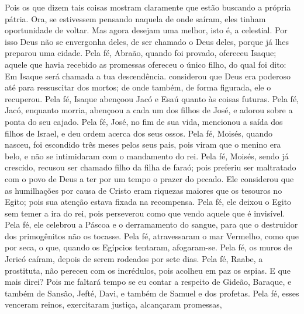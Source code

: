 {  Pois os que dizem tais coisas mostram claramente que estão buscando a
{} própria pátria.
  Ora, se estivessem pensando naquela de onde saíram, eles tinham oportunidade de voltar.
  Mas agora desejam uma melhor, isto é, a celestial. Por isso Deus não se envergonha deles, de ser chamado o Deus deles, porque já lhes preparou uma cidade.
  Pela fé, Abraão, quando foi provado, ofereceu Isaque; aquele que havia recebido as promessas ofereceu o
{} único filho,
  do qual foi dito: Em Isaque será chamada a tua descendência.
{}
   considerou que Deus era poderoso até para ressuscitar
{} dos mortos; de onde também, de forma figurada, ele o recuperou.
  Pela fé, Isaque abençoou Jacó e Esaú quanto às coisas futuras.
  Pela fé, Jacó, enquanto morria, abençoou a cada um dos filhos de José, e adorou
{} sobre a ponta do seu cajado.
  Pela fé, José, no fim de sua vida,
 mencionou a saída dos filhos de Israel, e deu ordem acerca dos seus ossos.
  Pela fé, Moisés, quando nasceu, foi escondido três meses pelos seus pais, pois viram que o menino era belo, e não se intimidaram com o mandamento do rei.
  Pela fé, Moisés, sendo já crescido, recusou ser chamado filho da filha de faraó;
  pois preferiu ser maltratado com o povo de Deus a ter por um tempo o prazer do pecado.
  Ele considerou que as humilhações por causa de Cristo eram riquezas maiores que os tesouros no Egito; pois sua atenção estava fixada na recompensa.
  Pela fé, ele deixou o Egito sem temer a ira do rei, pois perseverou como que vendo aquele que é invisível.
  Pela fé, ele celebrou a Páscoa e o derramamento do sangue, para que o destruidor dos primogênitos não os tocasse.
  Pela fé, atravessaram o mar Vermelho, como que por
{} seca, o que, quando os Egípcios tentaram, afogaram-se.
  Pela fé, os muros de Jericó caíram, depois de serem rodeados por sete dias.
  Pela fé, Raabe, a prostituta, não pereceu com os incrédulos,
 pois acolheu em paz os espias.
  E que mais direi? Pois me faltará tempo se eu contar a respeito de Gideão, Baraque, e também de Sansão, Jefté, Davi, e também de Samuel e dos profetas.
  Pela fé, esses venceram reinos, exercitaram justiça, alcançaram promessas,
}

